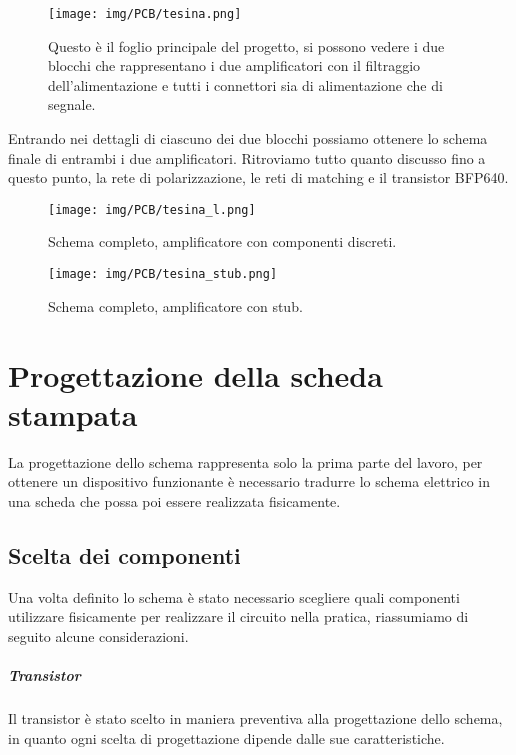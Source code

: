 \documentclass[12pt,oneside]{book}
\begin{document}
\begin{figure}[!htbp]
    \centering
    \texttt{[image: img/PCB/tesina.png]}
    \caption{Questo è il foglio principale del progetto, si possono vedere i due blocchi che rappresentano i due amplificatori con il filtraggio dell'alimentazione e tutti i connettori sia di alimentazione che di segnale.}
    \label{schem}
\end{figure}

Entrando nei dettagli di ciascuno dei due blocchi possiamo ottenere lo schema finale di entrambi i due amplificatori. Ritroviamo tutto quanto discusso fino a questo punto, la rete di polarizzazione, le reti di matching e il transistor BFP640.

\begin{figure}[!htbp]
    \centering
    \texttt{[image: img/PCB/tesina\_l.png]}
    \caption{Schema completo, amplificatore con componenti discreti.}
    \label{schem_l}
\end{figure}

\begin{figure}[!htbp]
    \centering
    \texttt{[image: img/PCB/tesina\_stub.png]}
    \caption{Schema completo, amplificatore con stub.}
    \label{schem_stub}
\end{figure}

\chapter{Progettazione della scheda stampata}
La progettazione dello schema rappresenta solo la prima parte del lavoro, per ottenere un dispositivo funzionante è necessario tradurre lo schema elettrico in una scheda che possa poi essere realizzata fisicamente.

\section{Scelta dei componenti}
Una volta definito lo schema è stato necessario scegliere quali componenti utilizzare fisicamente per realizzare il circuito nella pratica, riassumiamo di seguito alcune considerazioni.

\paragraph{Transistor} Il transistor è stato scelto in maniera preventiva alla progettazione dello schema, in quanto ogni scelta di progettazione dipende dalle sue caratteristiche.
\end{document}
